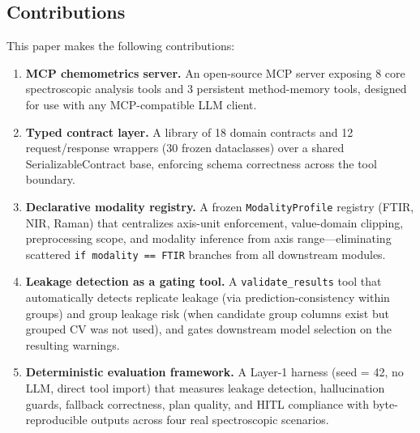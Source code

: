 \subsection{Contributions}

This paper makes the following contributions:

\begin{enumerate}
  \item \textbf{MCP chemometrics server.} An open-source MCP server exposing
    8 core spectroscopic analysis tools and 3 persistent method-memory tools,
    designed for use with any MCP-compatible LLM client.

  \item \textbf{Typed contract layer.} A library of 18 domain contracts and
    12 request/response wrappers (30 frozen dataclasses) over a shared
    SerializableContract base, enforcing schema correctness across the tool boundary.

  \item \textbf{Declarative modality registry.} A frozen \texttt{ModalityProfile}
    registry (FTIR, NIR, Raman) that centralizes axis-unit enforcement,
    value-domain clipping, preprocessing scope, and modality inference from
    axis range---eliminating scattered \texttt{if modality == \textquotedbl{}FTIR\textquotedbl{}} branches
    from all downstream modules.

  \item \textbf{Leakage detection as a gating tool.} A \texttt{validate\_results}
    tool that automatically detects replicate leakage (via prediction-consistency
    within groups) and group leakage risk (when candidate group columns exist
    but grouped CV was not used), and gates downstream model selection on the
    resulting warnings.

  \item \textbf{Deterministic evaluation framework.} A Layer-1 harness
    (seed = 42, no LLM, direct tool import) that measures leakage detection,
    hallucination guards, fallback correctness, plan quality, and HITL
    compliance with byte-reproducible outputs across four real spectroscopic
    scenarios.
\end{enumerate}
